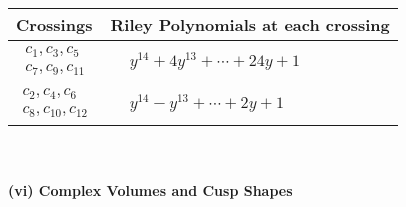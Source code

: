 \documentclass[1p]{elsarticle_modified}
\theoremstyle{definition}
\begin{document}
\begin{tabular}{m{50pt}|m{274pt}}
Crossings & \hspace{64pt}Riley Polynomials at each crossing \\
\hline $$\begin{aligned}c_{1},c_{3},c_{5}\\c_{7},c_{9},c_{11}\end{aligned}$$&$\begin{aligned}
&y^{14}+4 y^{13}+\cdots+24 y+1
\end{aligned}$\\
\hline $$\begin{aligned}c_{2},c_{4},c_{6}\\c_{8},c_{10},c_{12}\end{aligned}$$&$\begin{aligned}
&y^{14}- y^{13}+\cdots+2 y+1
\end{aligned}$\\
\hline
\end{tabular}\\~\\
\newpage\flushleft \textbf{(vi) Complex Volumes and Cusp Shapes}
\end{document}
